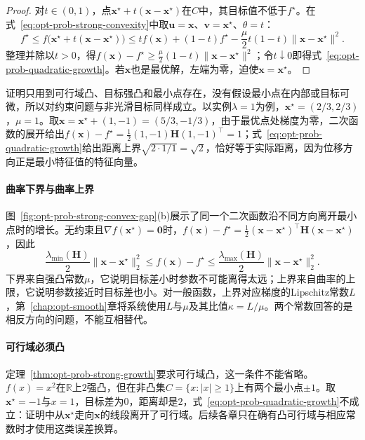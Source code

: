 \begin{proof}
对$t\in(0,1)$，点$\bm x^\star+t(\bm x-\bm x^\star)$在$C$中，其目标值不低于$f^\star$。在式~\eqref{eq:opt-prob-strong-convexity}中取$\bm u=\bm x$、$\bm v=\bm x^\star$、$\theta=t$：
\[
  f^\star\leq f\bigl(\bm x^\star+t(\bm x-\bm x^\star)\bigr)\leq tf(\bm x)+(1-t)f^\star-\frac{\mu}{2}t(1-t)\lVert\bm x-\bm x^\star\rVert^2.
\]
整理并除以$t>0$，得$f(\bm x)-f^\star\geq\frac{\mu}{2}(1-t)\lVert\bm x-\bm x^\star\rVert^2$；令$t\downarrow0$即得式~\eqref{eq:opt-prob-quadratic-growth}。若$\bm x$也是最优解，左端为零，迫使$\bm x=\bm x^\star$。
\end{proof}

证明只用到可行域凸、目标强凸和最小点存在，没有假设最小点在内部或目标可微，所以对约束问题与非光滑目标同样成立。以实例$\lambda=1$为例，$\bm x^\star=(2/3,2/3)$，$\mu=1$。取$\bm x=\bm x^\star+(1,-1)=(5/3,-1/3)$，由于最优点处梯度为零，二次函数的展开给出$f(\bm x)-f^\star=\frac12(1,-1)\bm H(1,-1)^\top=1$；式~\eqref{eq:opt-prob-quadratic-growth}给出距离上界$\sqrt{2\cdot1/1}=\sqrt2$，恰好等于实际距离，因为位移方向正是最小特征值的特征向量。

\paragraph{曲率下界与曲率上界}
图~\ref{fig:opt-prob-strong-convex-gap}(b)展示了同一个二次函数沿不同方向离开最小点时的增长。无约束且$\nabla f(\bm x^\star)=\bm 0$时，$f(\bm x)-f^\star=\frac12(\bm x-\bm x^\star)^\top\bm H(\bm x-\bm x^\star)$，因此
\[
  \frac{\lambda_{\min}(\bm H)}{2}\lVert\bm x-\bm x^\star\rVert_2^2\leq f(\bm x)-f^\star\leq\frac{\lambda_{\max}(\bm H)}{2}\lVert\bm x-\bm x^\star\rVert_2^2.
\]
下界来自强凸常数$\mu$，它说明目标差小时参数不可能离得太远；上界来自曲率的上限，它说明参数接近时目标差也小。对一般函数，上界对应梯度的Lipschitz常数$L$，第~\ref{chap:opt-smooth}章将系统使用$L$与$\mu$及其比值$\kappa=L/\mu$。两个常数回答的是相反方向的问题，不能互相替代。

\paragraph{可行域必须凸}
定理~\ref{thm:opt-prob-strong-growth}要求可行域凸，这一条件不能省略。$f(x)=x^2$在$\mathbb R$上$2$强凸，但在非凸集$C=\{x:|x|\geq1\}$上有两个最小点$\pm1$。取$\bm x^\star=-1$与$x=1$，目标差为$0$，距离却是$2$，式~\eqref{eq:opt-prob-quadratic-growth}不成立：证明中从$\bm x^\star$走向$\bm x$的线段离开了可行域。后续各章只在确有凸可行域与相应常数时才使用这类误差换算。
